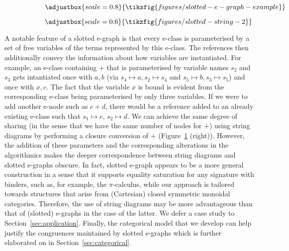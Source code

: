 \begin{figure}[t!]
	\begin{subfigure}[t]{0.45\linewidth}
\[
\adjustbox{scale=0.8}{
\tikzfig{figures/slotted-e-graph-example}
}
\]
	\end{subfigure}
	\hfill
\begin{subfigure}[t]{0.45\linewidth}
\[
\adjustbox{scale=0.6}{
\tikzfig{figures/slotted-string-2}
}
\]

\end{subfigure}
	\caption{}
	\label{fig:slotted}
\end{figure}

A notable feature of a slotted e-graph is that every e-class is parameterised by a set of free variables of the terms represented by this e-class.
The references then additionally convey the information about how variables are instantiated.
For example, an e-class containing $+$ that is parameterised by variable names $s_2$ and $s_3$ gets intantiated once with $a,b$ (via $s_4 \mapsto a, s_2 \mapsto s_4$ and $s_5 \mapsto b, s_3 \mapsto s_5$) and once  with $x,c$.
The fact that the variable $x$ is bound is evident from the corresponding e-class being parameterised by only three variables.
If we were to add another e-node such as $e + d$, there would be a reference added to an already existing e-class such that $s_1 \mapsto e$, $s_2 \mapsto d$.
We can achieve the same degree of sharing (in the sense that we have the same number of nodes for $+$) using string diagrams by performing a closure conversion of $+$ (Figure~\ref{fig:slotted} (right)).
However, the addition of these parameters and the corresponding alterations in the algorithmics makes the deeper correspondence between string diagrams and slotted e-graphs obscure.
In fact, slotted e-graph appears to be a more general construction in a sense that it supports equality saturation for any signature with binders, such as, for example, the $\pi$-calculus, while our approach is tailored towards structures that arise from (Cartesian) closed symmetric monoidal categories.
Therefore, the use of string diagrams may be more advantageous than that of (slotted) e-graphs in the case of the latter.
We defer a case study to Section~\ref{sec:application}.
Finally, the categorical model that we develop can help justify the congruences maintained by slotted e-graphs which is further elaborated on in Section~\ref{sec:categorical}.



